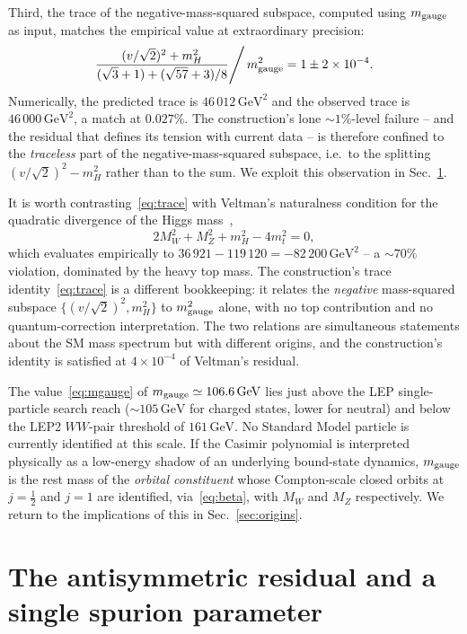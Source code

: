 \documentclass[twocolumn,aps,prd,floatfix,nofootinbib,superscriptaddress,10pt]{article}
\newcommand{\MW}{M_W}
\newcommand{\MZ}{M_Z}
\newcommand{\mH}{m_H}
\newcommand{\GeV}{\,\mathrm{GeV}}
\begin{document}
Third, the trace of the negative-mass-squared subspace, computed using $m_{\rm gauge}$ as input, matches the empirical value at extraordinary precision:
\begin{equation}
\frac{(v/\sqrt{2})^2+\mH^2}{(\sqrt{3}+1)+(\sqrt{57}+3)/8}\Bigg/\,m_{\rm gauge}^2 = 1\pm 2\times 10^{-4}.
\label{eq:trace}
\end{equation}
Numerically, the predicted trace is $46\,012\GeV^2$ and the observed trace is $46\,000\GeV^2$, a match at $0.027\%$. The construction's lone $\sim 1\%$-level failure -- and the residual that defines its tension with current data -- is therefore confined to the {\em traceless} part of the negative-mass-squared subspace, i.e.\ to the splitting $(v/\sqrt{2})^2-\mH^2$ rather than to the sum. We exploit this observation in Sec.~\ref{sec:spurion}.

It is worth contrasting~\eqref{eq:trace} with Veltman's naturalness condition for the quadratic divergence of the Higgs mass~\cite{Veltman1981},
\begin{equation}
2\MW^2+\MZ^2+\mH^2-4m_t^2 = 0,
\label{eq:veltman}
\end{equation}
which evaluates empirically to $36\,921 - 119\,120 = -82\,200\GeV^2$ -- a $\sim 70\%$ violation, dominated by the heavy top mass. The construction's trace identity~\eqref{eq:trace} is a different bookkeeping: it relates the {\em negative} mass-squared subspace $\{(v/\sqrt{2})^2,\mH^2\}$ to $m_{\rm gauge}^2$ alone, with no top contribution and no quantum-correction interpretation. The two relations are simultaneous statements about the SM mass spectrum but with different origins, and the construction's identity is satisfied at $4\times 10^{-4}$ of Veltman's residual.

The value~\eqref{eq:mgauge} of $m_{\rm gauge}\simeq 106.6\GeV$ lies just above the LEP single-particle search reach ($\sim 105\GeV$ for charged states, lower for neutral) and below the LEP2 $WW$-pair threshold of $161\GeV$. No Standard Model particle is currently identified at this scale. If the Casimir polynomial is interpreted physically as a low-energy shadow of an underlying bound-state dynamics, $m_{\rm gauge}$ is the rest mass of the {\em orbital constituent} whose Compton-scale closed orbits at $j=\tfrac12$ and $j=1$ are identified, via~\eqref{eq:beta}, with $\MW$ and $\MZ$ respectively. We return to the implications of this in Sec.~\ref{sec:origins}.

\section{The antisymmetric residual and a single spurion parameter}
\label{sec:spurion}
\end{document}
